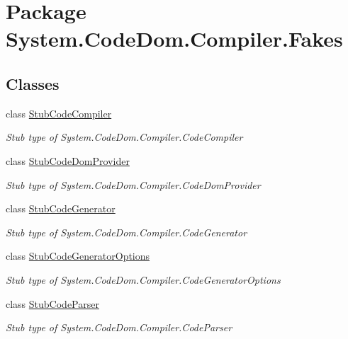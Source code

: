 \hypertarget{namespace_system_1_1_code_dom_1_1_compiler_1_1_fakes}{\section{Package System.\-Code\-Dom.\-Compiler.\-Fakes}
\label{namespace_system_1_1_code_dom_1_1_compiler_1_1_fakes}
}
\subsection*{Classes}
\begin{DoxyCompactItemize}
\item 
class \hyperlink{class_system_1_1_code_dom_1_1_compiler_1_1_fakes_1_1_stub_code_compiler}{Stub\-Code\-Compiler}
\begin{DoxyCompactList}\small\item\em Stub type of System.\-Code\-Dom.\-Compiler.\-Code\-Compiler\end{DoxyCompactList}\item 
class \hyperlink{class_system_1_1_code_dom_1_1_compiler_1_1_fakes_1_1_stub_code_dom_provider}{Stub\-Code\-Dom\-Provider}
\begin{DoxyCompactList}\small\item\em Stub type of System.\-Code\-Dom.\-Compiler.\-Code\-Dom\-Provider\end{DoxyCompactList}\item 
class \hyperlink{class_system_1_1_code_dom_1_1_compiler_1_1_fakes_1_1_stub_code_generator}{Stub\-Code\-Generator}
\begin{DoxyCompactList}\small\item\em Stub type of System.\-Code\-Dom.\-Compiler.\-Code\-Generator\end{DoxyCompactList}\item 
class \hyperlink{class_system_1_1_code_dom_1_1_compiler_1_1_fakes_1_1_stub_code_generator_options}{Stub\-Code\-Generator\-Options}
\begin{DoxyCompactList}\small\item\em Stub type of System.\-Code\-Dom.\-Compiler.\-Code\-Generator\-Options\end{DoxyCompactList}\item 
class \hyperlink{class_system_1_1_code_dom_1_1_compiler_1_1_fakes_1_1_stub_code_parser}{Stub\-Code\-Parser}
\begin{DoxyCompactList}\small\item\em Stub type of System.\-Code\-Dom.\-Compiler.\-Code\-Parser\end{DoxyCompactList}\item 

\end{DoxyCompactItemize}
